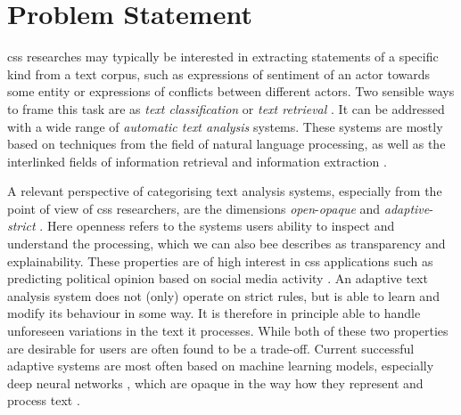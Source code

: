 \documentclass[11pt, numbers=noenddot]{scrreprt}
\let\cite\parencite  %
\begin{document}
%



%

\chapter{Problem Statement}
\label{cha:problem-statement}

\gls{css} researches may typically be interested in extracting statements of a specific kind from a text corpus, such as expressions of sentiment of an actor towards some entity or expressions of conflicts between different actors. Two sensible ways to frame this task are as \textit{text classification} \cite{kowsariTextClassificationAlgorithms2019} or \textit{text retrieval} \cite{manningIntroductionInformationRetrieval2008}. It can be addressed with a wide range of \textit{automatic text analysis} systems. These systems are mostly based on techniques from the field of natural language processing, as well as the interlinked fields of information retrieval and information extraction \cite{chowdharyNaturalLanguageProcessing2020}.

A relevant perspective of categorising text analysis systems, especially from the point of view of \gls{css} researchers, are the dimensions \textit{open}-\textit{opaque} and \textit{adaptive}-\textit{strict} \cite{menezesSemanticHypergraphs2021}. Here openness refers to the systems users ability to inspect and understand the processing, which we can also bee describes as transparency and explainability. These properties are of high interest in \gls{css} applications such as predicting political opinion based on social media activity \cite{wilkersonLargeScaleComputerizedText2017}. An adaptive text analysis system does not (only) operate on strict rules, but is able to learn and modify its behaviour in some way. It is therefore in principle able to handle unforeseen variations in the text it processes. While both of these two properties are desirable for users are often found to be a trade-off. Current successful adaptive systems are most often based on machine learning models, especially deep neural networks \cite{hirschbergAdvancesNaturalLanguage2015}, which are opaque in the way how they represent and process text \cite{rudinStopExplainingBlack2019}.
\end{document}
